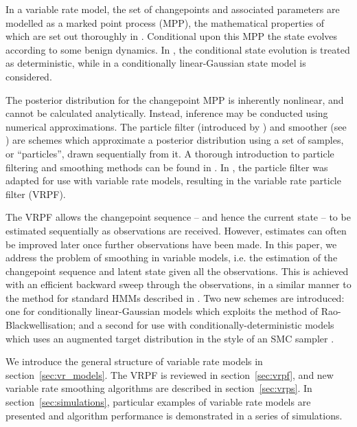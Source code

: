 \documentclass[journal]{IEEEtran}
\begin{document}
In a variable rate model, the set of changepoints and associated parameters are modelled as a marked point process (MPP), the mathematical properties of which are set out thoroughly in \cite{Jacobsen2006}. Conditional upon this MPP the state evolves according to some benign dynamics. In \cite{Godsill2007,Whiteley2011}, the conditional state evolution is treated as deterministic, while in \cite{Godsill2007a,Christensen2012} a conditionally linear-Gaussian state model is considered.

The posterior distribution for the changepoint MPP is inherently nonlinear, and cannot be calculated analytically. Instead, inference may be conducted using numerical approximations. The particle filter (introduced by \cite{Gordon1993}) and smoother (see \cite{Doucet2000a,Godsill2004}) are schemes which approximate a posterior distribution using a set of samples, or ``particles'', drawn sequentially from it.  A thorough introduction to particle filtering and smoothing methods can be found in \cite{Cappe2007,Doucet2009}. In \cite{Godsill2007a,Godsill2007,Whiteley2011}, the particle filter was adapted for use with variable rate models, resulting in the variable rate particle filter (VRPF).

The VRPF allows the changepoint sequence -- and hence the current state -- to be estimated sequentially as observations are received. However, estimates can often be improved later once further observations have been made. In this paper, we address the problem of smoothing in variable models, i.e. the estimation of the changepoint sequence and latent state given all the observations. This is achieved with an efficient backward sweep through the observations, in a similar manner to the method for standard HMMs described in \cite{Godsill2004}. Two new schemes are introduced: one for conditionally linear-Gaussian models which exploits the method of Rao-Blackwellisation; and a second for use with conditionally-deterministic models which uses an augmented target distribution in the style of an SMC sampler \cite{DelMoral2006}.

We introduce the general structure of variable rate models in section~\ref{sec:vr_models}. The VRPF is reviewed in section~\ref{sec:vrpf}, and new variable rate smoothing algorithms are described in section~\ref{sec:vrps}. In section~\ref{sec:simulations}, particular examples of variable rate models are presented and algorithm performance is demonstrated in a series of simulations.
\end{document}

